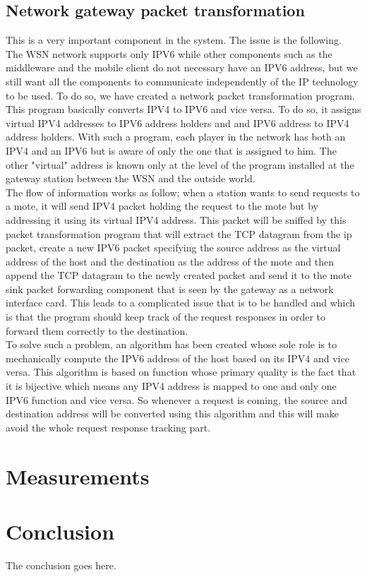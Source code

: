 \documentclass[conference]{IEEEtran}
\begin{document}
\subsection{Network gateway packet transformation}
This is a very important component in the system. The issue is the following. The WSN network supports only IPV6 while other components such as the middleware and the mobile client do not necessary have an IPV6 address, but we still want all the components to communicate independently of the IP technology to be used. To do so, we have created a network packet transformation program. This program basically converts IPV4 to IPV6 and vice versa. To do so, it assigns virtual IPV4 addresses to IPV6 address holders and and IPV6 address to IPV4 address holders. With such a program, each player in the network has both an IPV4 and an IPV6 but is aware of only the one that is assigned to him. The other "virtual" address is known only at the level of the program installed at the gateway station between the WSN and the outside world. 
\\
 The flow of information works as follow; when a station wants to send requests to a mote, it will send IPV4 packet holding the request to the mote but by addressing it using its virtual IPV4 address. This packet will be sniffed by this packet transformation program that will extract the TCP datagram from the ip packet, create a new IPV6 packet specifying the source address as the virtual address of the host and the destination as the address of the mote and then append the TCP datagram to the newly created packet and send it to the mote sink packet forwarding component that is seen by the gateway as a network interface card. This leads to a complicated issue that is to be handled and which is that the program should keep track of the request responses in order to forward them correctly to the destination. 
\\
To solve such a problem, an algorithm has been created whose sole role is to mechanically compute the IPV6 address of the host based on its IPV4 and vice versa. This algorithm is based on function whose primary quality is the fact that it is bijective which means any IPV4 address is mapped to one and only one IPV6 function and vice versa. So whenever a request is coming, the source and destination address will be converted using this algorithm and this will make avoid the whole request response tracking part.
\section{Measurements}

\section{Conclusion}
The conclusion goes here.


\mbox{}
\nocite{*}
 

     
\end{document}
